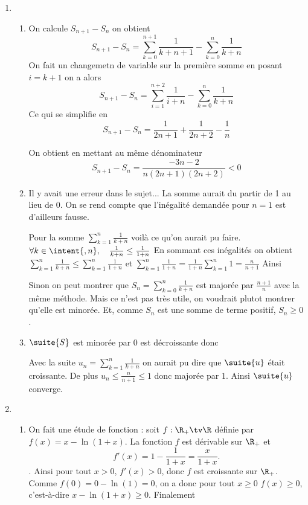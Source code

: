 \documentclass[a4paper, 11pt,reqno]{article}
\begin{document}
\begin{correction}
\begin{enumerate}
\item 
\begin{enumerate}
\item On calcule $S_{n+1}-S_n$ on obtient 
$$S_{n+1}-S_n = \sum_{k=0}^{n+1} \frac{1}{k+n+1}- \sum_{k=0}^n \frac{1}{k+n}$$
On fait un changemetn de variable sur la première somme en posant $i=k+1$ on a alors 
$$S_{n+1} -S_n  =\sum_{i=1}^{n+2} \frac{1}{i+n}- \sum_{k=0}^n \frac{1}{k+n}$$
Ce qui se simplifie en 
$$S_{n+1} -S_n  =\frac{1}{2n+1} +\frac{1}{2n+2} - \frac{1}{n}$$

On obtient en mettant au même dénominateur 
$$S_{n+1}-S_n  =\frac{-3n-2}{n(2n+1)(2n+2)}<0$$









\item
Il y avait une erreur dans le sujet... La somme aurait du partir de 1 au lieu de $0$. On se rend compte que l'inégalité demandée pour $n=1$ est d'ailleurs fausse. 

Pour la somme $\sum_{k=1}^n\frac{1}{k+n}$ voilà ce qu'on aurait pu faire. 
$\forall k\in \intent{,n}, \quad \frac{1}{k+n}\leq \frac{1}{1+n}$
En sommant ces inégalités on obtient 
$\sum_{k=1}^n \frac{1}{k+n}\leq \sum_{k=1}^n \frac{1}{1+n}$
et $\sum_{k=1}^n \frac{1}{1+n} =\frac{1}{1+n}\sum_{k=1}^n 1 = \frac{n}{n+1}$
Ainsi

Sinon on peut montrer que $S_n = \sum_{k=0}^{n} \frac{1}{k+n}$ est majorée par $\frac{n+1}{n}$ avec la même méthode. Mais ce n'est pas très utile, on voudrait plutot montrer qu'elle est minorée.  Et, comme $S_n$ est une somme de terme positif, $S_n\geq 0$. 

\item 
$\suite{S}$ est minorée par $0$ est  décroissante donc

Avec la suite $u_n =\sum_{k=1}^n \frac{1}{k+n}$ on aurait pu dire que $\suite{u}$ était croissante. De plus $u_n\leq \frac{n}{n+1}\leq 1$ donc majorée par $1$. Ainsi $\suite{u}$ converge. 

\end{enumerate}
\item 
\begin{enumerate}


\item On fait une étude de fonction : soit $f : \R_+ \tv \R$ définie par $f(x)=x-\ln(1+x)$.  La fonction $f$ est dérivable sur $\R_+$ et $$f'(x) =1 -\frac{1}{1+x}= \frac{x}{1+x}.$$.
Ainsi pour tout $x>0$, $f'(x)>0$, donc $f$ est croissante sur $\R_+$. Comme $f(0)=0-\ln(1) =0$, on a donc pour tout $x\geq 0$
$f(x)\geq 0$, c'est-à-dire $x-\ln(1+x)\geq 0$. Finalement 
 

\end{enumerate}
\end{enumerate}
\end{correction}
\end{document}
